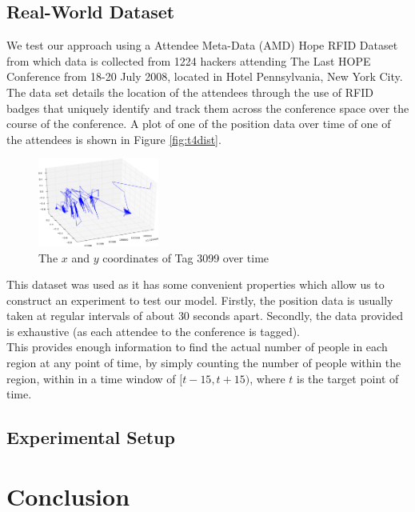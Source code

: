 \documentclass[letterpaper]{article}
\begin{document}
\subsection{Real-World Dataset}

We test our approach using a Attendee Meta-Data (AMD) Hope RFID Dataset from which data is collected from 1224 hackers attending The Last HOPE Conference from 18-20 July 2008, located in Hotel Pennsylvania, New York City.\\

The data set details the location of the attendees through the use of RFID badges that uniquely identify and track them across the conference space over the course of the conference. A plot of one of the position data over time of one of the attendees is shown in Figure \ref{fig:t4dist}.\\

\begin{figure}[h!]
  \centering
    \includegraphics[width=150px,natwidth=675,natheight=493]{positiondata.png}
  \caption{The $x$ and $y$ coordinates of Tag 3099 over time}
  \label{fig:spaths}
\end{figure}

This dataset was used as it has some convenient properties which allow us to construct an experiment to test our model. Firstly, the position data is usually taken at regular intervals of about $30$ seconds apart. Secondly, the data provided is exhaustive (as each attendee to the conference is tagged). \\

This provides enough information to find the actual number of people in each region at any point of time, by simply counting the number of people within the region, within in a time window of $[t-15,t+15)$, where $t$ is the target point of time.

\subsection{Experimental Setup}



\section{Conclusion}
\end{document}
